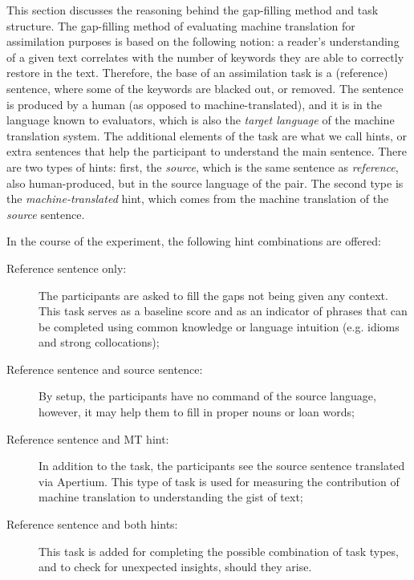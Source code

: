 \documentclass[11pt]{article}
\newcommand{\comment}[1]{\marginpar{\scriptsize\sf \textcolor{blue}{#1}}}
\begin{document}
This section discusses the reasoning behind the gap-filling method and task structure. The gap-filling method 
of evaluating machine translation for assimilation purposes is based on the following notion: a reader's understanding 
of a given text correlates with the number of keywords they are able to correctly restore in the text. Therefore, the 
base of an assimilation task is a (reference) sentence, where some of the keywords are blacked out, or removed. The sentence 
is produced by a human (as opposed to machine-translated), and it is in the language known to evaluators, which is also 
the \emph{target language} of the machine translation system.
\comment{FMT: It would also be nice to have a screenshot here}
The additional elements of the task are what we call hints, or extra sentences that help the participant to understand 
the main sentence. There are two types of hints: first, the \emph{source}, which is the same sentence as \emph{reference}, 
also human-produced, but in the source language of the pair. The second type is the \emph{machine-translated} hint, which 
comes from the machine translation of the \emph{source } sentence.

\comment{EA: I don't really have a good explanation why we used source+mt tasks, except for being exhaustive. could you suggest anything?}
In the course of the experiment, the following hint combinations are offered:
\begin{description}
\item[Reference sentence only:] The participants are asked to fill the gaps not being given
any context. This task serves as a baseline score and as an indicator of phrases
that can be completed using common knowledge or language intuition (e.g.
idioms and strong collocations);
\item[Reference sentence and source sentence:] By setup, the
participants have no command of the source language, however, it may help them to fill
in proper nouns or loan words;
\item[Reference sentence and MT hint:] In addition to the task, the
participants see the source sentence translated via Apertium. This type of task is
used for measuring the contribution of machine translation to understanding the
gist of text;
\item[Reference sentence and both hints:] This task is
added for completing the possible combination of task types, and to check
for unexpected insights, should they arise.
\end{description}
\end{document}
